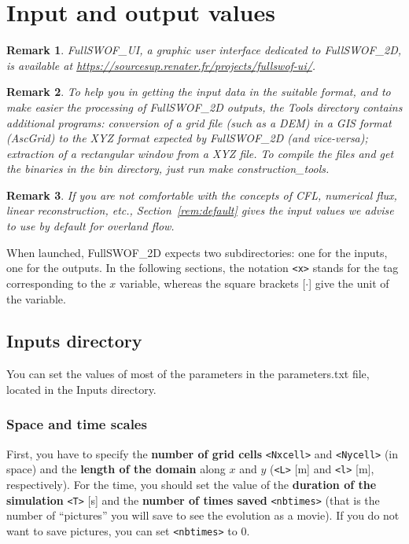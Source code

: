 \documentclass[a4paper, 11pt]{article}
\newcommand{\FullSWOF}{FullSWOF\_2D}
\newcommand{\FullSWOFUI}{FullSWOF\_UI}
\newtheorem{rmk}{Remark}
\begin{document}
\section{Input and output values}
\begin{rmk}
	\FullSWOFUI{}, a graphic user interface dedicated to \FullSWOF{}, is available at
	\textnormal{\url{https://sourcesup.renater.fr/projects/fullswof-ui/}}.
\end{rmk}

\begin{rmk}
	To help you in getting the input data in the suitable format, and to make easier the processing of \FullSWOF{} outputs, the \textnormal{\textsf{Tools}} directory contains additional programs: conversion of a grid file (such as a DEM) in a GIS format (AscGrid) to the XYZ format expected by \FullSWOF{} (and vice-versa); extraction of a rectangular window from a XYZ file. To compile the files and get the binaries in the \textnormal{\textsf{bin}} directory, just run \textnormal{\textsf{make construction\_tools}}. 
\end{rmk}

\begin{rmk}
	If you are not comfortable with the concepts of CFL, numerical flux, linear reconstruction, etc., Section~\ref{rem:default} gives the input values we advise to use by default for overland flow.
\end{rmk}

When launched, \FullSWOF{} expects two subdirectories: one for the inputs, one for the outputs.
In the following sections, the notation \texttt{<x>} stands for the tag corresponding to the \(x\) variable, whereas the square brackets [\(\cdot\)] give the unit of the variable.

\subsection{\textsf{Inputs} directory}

You can set the values of most of the parameters in the \textsf{parameters.txt} file, located in the \textsf{Inputs} directory.

\subsubsection{Space and time scales}

First, you have to specify the \textbf{number of grid cells} \texttt{<Nxcell>} and \texttt{<Nycell>} (in space) and the \textbf{length of  the domain} along \(x\) and \(y\) (\texttt{<L>} [\si{\meter}] and \texttt{<l>} [\si{\meter}], respectively).
For the time, you should set the value of the \textbf{duration of the simulation} \texttt{<T>} [\si{\second}] and the \textbf{number of times saved} \texttt{<nbtimes>} (that is the number of ``pictures'' you will save to see the evolution as a movie).\newline
If you do not want to save pictures, you can set \texttt{<nbtimes>} to 0.
\end{document}
